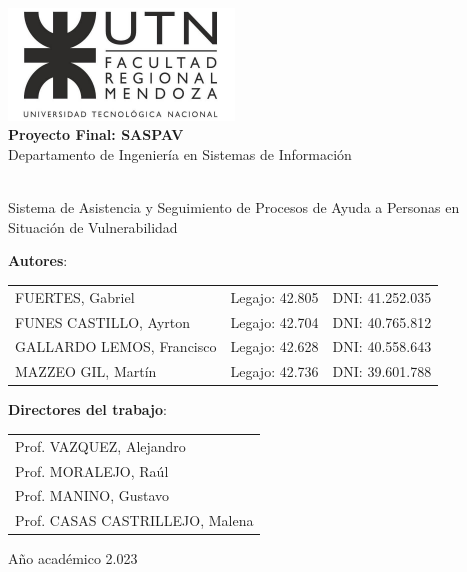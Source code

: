 \pagestyle{empty}
\begin{titlepage}

\mbox{}
\vspace{-2cm}

\begin{center}
    \includegraphics[width=6cm]{./figuras/logo/frm.jpg}
    \\
    \vspace{1cm}
    {\Huge \bf Proyecto Final: SASPAV}
    \\
    \vspace{0.25cm}
    {\Large Departamento de Ingeniería en Sistemas de Información}
    \\
    \vspace{0.5cm}
    
    \\
    \vspace{0.5cm}
    {Sistema de Asistencia y Seguimiento de Procesos de Ayuda a Personas en Situación de Vulnerabilidad}\\
\end{center}

\noindent
\textbf{\large{Autores}}:\\
\begin{tabularx}{\textwidth}{Xlr}
    FUERTES, Gabriel & Legajo: 42.805 & DNI: 41.252.035\\
    FUNES CASTILLO, Ayrton & Legajo: 42.704 & DNI: 40.765.812\\
    GALLARDO LEMOS, Francisco & Legajo: 42.628 & DNI: 40.558.643\\
    MAZZEO GIL, Martín & Legajo: 42.736 & DNI: 39.601.788\\
\end{tabularx}

\vspace{0.5cm}

\noindent
\textbf{\large{Directores del trabajo}}:\\
\begin{tabular}{l}
    Prof. VAZQUEZ, Alejandro\\
    Prof. MORALEJO, Raúl\\
    Prof. MANINO, Gustavo\\
    Prof. CASAS CASTRILLEJO, Malena\\
\end{tabular}

\vspace{0.5cm}

\begin{center}
    Año académico 2.023\\
\end{center}
\begin{center}
    
\end{center}

\end{titlepage}

\null
\cleardoublepage
